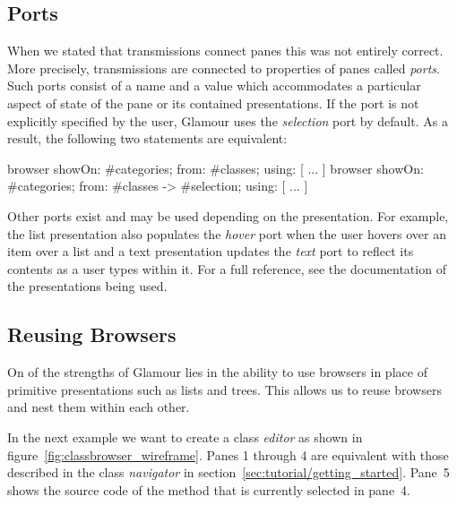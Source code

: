 \documentclass[a4paper,10pt,twoside]{book}
\begin{document}
\subsection{Ports}

When we stated that transmissions connect panes this was not entirely correct. More precisely, transmissions are connected to properties of panes called \emph{ports}. Such ports consist of  a name and a value which accommodates a particular aspect of state of the pane or its contained presentations. If the port is not explicitly specified by the user, Glamour uses the \emph{selection} port by default. As a result, the following two statements are equivalent:

\begin{code}{}
browser showOn: #categories; from: #classes; using: [ ... ]
browser showOn: #categories; from: #classes -> #selection; using: [ ... ]
\end{code}

Other ports exist and may be used depending on the presentation. For example, the list presentation also populates the \emph{hover} port when the user hovers over an item over a list and a text presentation updates the \emph{text} port to reflect its contents as a user types within it. For a full reference, see the documentation of the presentations being used.


\subsection{Reusing Browsers}
\label{sec:tutorial/reusing-browsers}

On of the strengths of Glamour lies in the ability to use browsers in place of primitive presentations such as lists and trees. This allows us to reuse browsers and nest them within each other.

In the next example we want to create a class \emph{editor} as shown in figure~\ref{fig:classbrowser_wireframe}. Panes 1 through 4 are equivalent with those described in the class \emph{navigator} in section~\ref{sec:tutorial/getting_started}. Pane~5 shows the source code of the method that is currently selected in pane~4.
\end{document}
